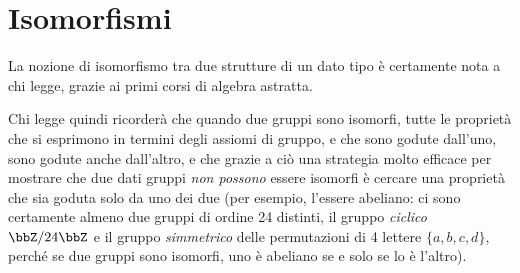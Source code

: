 \section{Isomorfismi}\label{sec_isomorfismi}
La nozione di isomorfismo tra due strutture di un dato tipo è certamente nota a chi legge, grazie ai primi corsi di algebra astratta.

Chi legge quindi ricorderà che quando due gruppi sono isomorfi, tutte le proprietà che si esprimono in termini degli assiomi di gruppo, e che sono godute dall'uno, sono godute anche dall'altro, e che grazie a ciò una strategia molto efficace per mostrare che due dati gruppi \emph{non possono} essere isomorfi è cercare una proprietà che sia goduta solo da uno dei due (per esempio, l'essere abeliano: ci sono certamente almeno due gruppi di ordine 24 distinti, il gruppo \emph{ciclico} \(\bbZ/24\bbZ\) e il gruppo \emph{simmetrico} delle permutazioni di 4 lettere \(\{a,b,c,d\}\), perché se due gruppi sono isomorfi, uno è abeliano se e solo se lo è l'altro).

